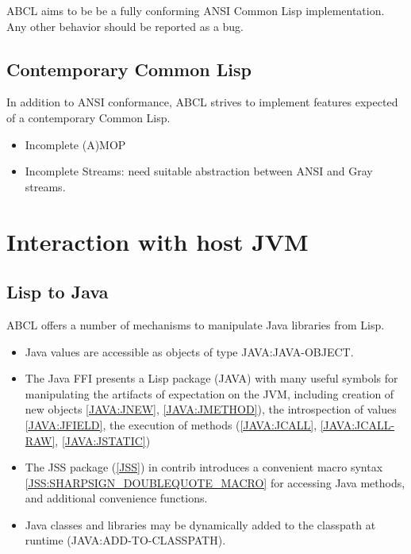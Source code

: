 \documentclass[10pt]{book}
\begin{document}
ABCL aims to be be a fully conforming ANSI Common Lisp
implementation.  Any other behavior should be reported as a bug.

\section{Contemporary Common Lisp}
In addition to ANSI conformance, ABCL strives to implement features
expected of a contemporary Common Lisp.
\begin{itemize}
  \item Incomplete (A)MOP 
  \item Incomplete Streams:  need suitable abstraction between ANSI
    and Gray streams.
    
\end{itemize}

\chapter{Interaction with host JVM}


\section{Lisp to Java}

ABCL offers a number of mechanisms to manipulate Java libraries from
Lisp.

\begin{itemize}
\item Java values are accessible as objects of type JAVA:JAVA-OBJECT.
\item The Java FFI presents a Lisp package (JAVA) with many useful
  symbols for manipulating the artifacts of expectation on the JVM,
  including creation of new objects \ref{JAVA:JNEW}, \ref{JAVA:JMETHOD}), the
  introspection of values \ref{JAVA:JFIELD}, the execution of methods
  (\ref{JAVA:JCALL}, \ref{JAVA:JCALL-RAW}, \ref{JAVA:JSTATIC})
\item The JSS package (\ref{JSS}) in contrib introduces a convenient macro
  syntax \ref{JSS:SHARPSIGN_DOUBLEQUOTE_MACRO} for accessing Java
  methods, and additional convenience functions.
\item Java classes and libraries may be dynamically added to the
  classpath at runtime (JAVA:ADD-TO-CLASSPATH).
\end{itemize}
\end{document}
